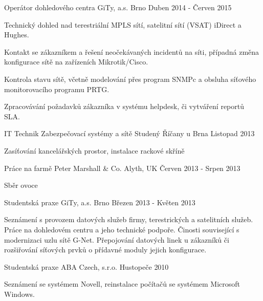 

\begin{cventries}

  \cventry
    {Operátor dohledového centra} %
    {GiTy, a.s.} %
    {Brno} %
    {Duben 2014 - Červen 2015} %
    {
      \begin{cvitems} %
        \item {Technický dohled nad terestriální MPLS sítí, satelitní sítí (VSAT) iDirect a Hughes.}
        \item {Kontakt se zákazníkem a řešení neočekávaných incidentů na síti, případná změna konfigurace sítě na zařízeních Mikrotik/Cisco.}
        \item {Kontrola stavu sítě, včetně modelování přes program SNMPc a obsluha síťového monitorovacího programu PRTG.}
        \item {Zpracovávání požadavků zákazníka v systému helpdesk, či vytváření reportů SLA. }
      \end{cvitems}
    }
   \cventry
   {IT Technik}
   {Zabezpečovací systémy a sítě Studený}
   {Říčany u Brna}
   {Listopad 2013}
   {
    \begin{cvitems}
      \item {Zasíťování kancelářských prostor, instalace rackové skříně}
    \end{cvitems}
   }
   \cventry
   {Práce na farmě}
   {Peter Marshall \& Co.}
   {Alyth, UK}
   {Červen 2013 - Srpen 2013}
   {
    \begin{cvitems}
      \item {Sběr ovoce}
    \end{cvitems}
   }
   \cventry
   {Studentská praxe}
   {GiTy, a.s.}
   {Brno}
   {Březen 2013 - Květen 2013}
   {
    \begin{cvitems}
      \item {Seznámení s provozem datových služeb firmy, terestrických a satelitních služeb. Práce na dohledovém centru a jeho technické podpoře.
      Činosti související s modernizaci uzlu sítě G-Net. Přepojování datových linek u zákazníků či rozšiřování síťových prvků o přídavné moduly jejich konfigurace.}
    \end{cvitems}
   }
   \cventry
   {Studentská praxe}
   {ABA Czech, s.r.o.}
   {Hustopeče}
   {2010}
   {
    \begin{cvitems}
      \item {Seznámení se systémem Novell, reinstalace počítačů se systémem Microsoft Windows.}
    \end{cvitems}
   }

\end{cventries}
